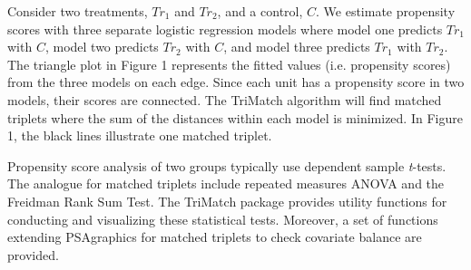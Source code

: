 \documentclass[11pt, a4paper]{article}
\newcommand{\pkg}[1]{{\normalfont\fontseries{b}\selectfont #1}}
\begin{document}
Consider two treatments, $Tr_1$ and $Tr_2$, and a control, $C$. We estimate propensity scores with three separate logistic regression models where model one predicts $Tr_1$ with $C$, model two predicts $Tr_2$ with $C$, and model three predicts $Tr_1$ with $Tr_2$. The triangle plot in Figure 1 represents the fitted values (i.e. propensity scores) from the three models on each edge. Since each unit has a propensity score in two models, their scores are connected. The \pkg{TriMatch} algorithm will find matched triplets where the sum of the distances within each model is minimized. In Figure 1, the black lines illustrate one matched triplet.


Propensity score analysis of two groups typically use dependent sample \textit{t}-tests. The analogue for matched triplets include repeated measures ANOVA and the Freidman Rank Sum Test. The \pkg{TriMatch} package provides utility functions for conducting and visualizing these statistical tests. Moreover, a set of functions extending \pkg{PSAgraphics} \citep{HelmreichPruzek2008} for matched triplets to check covariate balance are provided.




\end{document}
